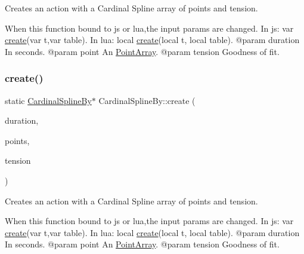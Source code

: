 Creates an action with a Cardinal Spline array of points and tension. 
\begin{DoxyCode}
When \textcolor{keyword}{this} \textcolor{keyword}{function} bound to js or lua,the input params are changed.
In js: var \hyperlink{classCardinalSplineBy_ac91380c9ea7b3209fe20d13995515bd2}{create}(var t,var table).
In lua: local \hyperlink{classCardinalSplineBy_ac91380c9ea7b3209fe20d13995515bd2}{create}(local t, local table).
@param duration In seconds.
@param point An \hyperlink{classPointArray}{PointArray}.
@param tension Goodness of fit.
\end{DoxyCode}
 \mbox{\label{classCardinalSplineBy_ad78125bb039894374af64265a85f6294}} 
\subsubsection{\texorpdfstring{create()}{create()}\hspace{0.1cm}{\footnotesize\ttfamily [2/2]}}
{\footnotesize\ttfamily static \hyperlink{classCardinalSplineBy}{Cardinal\+Spline\+By}$\ast$ Cardinal\+Spline\+By\+::create (\begin{DoxyParamCaption}\item[{float}]{duration,  }\item[{\hyperlink{classPointArray}{Point\+Array} $\ast$}]{points,  }\item[{float}]{tension }\end{DoxyParamCaption})\hspace{0.3cm}{\ttfamily [static]}}

Creates an action with a Cardinal Spline array of points and tension. 
\begin{DoxyCode}
When \textcolor{keyword}{this} \textcolor{keyword}{function} bound to js or lua,the input params are changed.
In js: var \hyperlink{classCardinalSplineBy_ac91380c9ea7b3209fe20d13995515bd2}{create}(var t,var table).
In lua: local \hyperlink{classCardinalSplineBy_ac91380c9ea7b3209fe20d13995515bd2}{create}(local t, local table).
@param duration In seconds.
@param point An \hyperlink{classPointArray}{PointArray}.
@param tension Goodness of fit.
\end{DoxyCode}
 \mbox{\label{classCardinalSplineBy_ac5084ddc681589404f2a26d52815344b}} 
